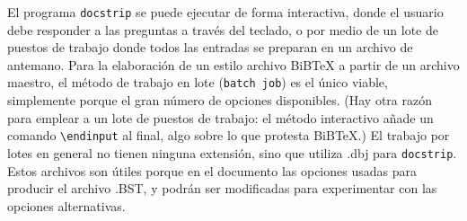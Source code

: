 	
El programa \verb|docstrip| se puede ejecutar de forma interactiva, donde el usuario debe responder a las preguntas a través del teclado, o por medio de un lote de puestos de trabajo donde todos las entradas se preparan en un archivo de antemano. Para la elaboración de un estilo archivo BiB\TeX{} a partir de un archivo maestro, el método de trabajo en lote (\verb|batch job|) es el único viable, simplemente porque el gran número de opciones disponibles. (Hay otra razón para emplear a un lote de puestos de trabajo: el método interactivo añade un comando \verb|\endinput|  al final, algo sobre lo que  protesta BiB\TeX{}.) El trabajo por lotes en general no tienen ninguna extensión, sino que utiliza  .dbj para \verb|docstrip|. Estos archivos son útiles porque en el documento las opciones usadas para producir el archivo .BST,  y podrán ser modificadas para experimentar con las opciones alternativas.\\


